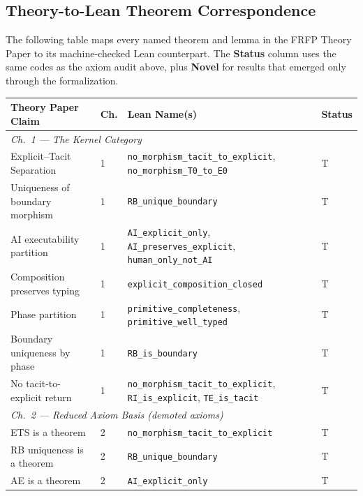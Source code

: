 \subsection*{Theory-to-Lean Theorem Correspondence}
\label{sec:theory_lean_table}

The following table maps every named theorem and lemma in the FRFP Theory Paper
to its machine-checked Lean counterpart.  The \textbf{Status} column uses the
same codes as the axiom audit above, plus \textbf{Novel} for results that
emerged only through the formalization.

\begin{center}
\begin{tabular}{p{4.5cm}lp{4.8cm}l}
\toprule
Theory Paper Claim & Ch. & Lean Name(s) & Status \\
\midrule
\multicolumn{4}{l}{\textit{Ch.~1 — The Kernel Category}} \\[2pt]
Explicit--Tacit Separation
  & 1 & \texttt{no\_morphism\_tacit\_to\_explicit}, \texttt{no\_morphism\_T0\_to\_E0}  & T \\
Uniqueness of boundary morphism
  & 1 & \texttt{RB\_unique\_boundary}              & T \\
AI executability partition
  & 1 & \texttt{AI\_explicit\_only}, \texttt{AI\_preserves\_explicit}, \texttt{human\_only\_not\_AI} & T \\
Composition preserves typing
  & 1 & \texttt{explicit\_composition\_closed}     & T \\
Phase partition
  & 1 & \texttt{primitive\_completeness}, \texttt{primitive\_well\_typed} & T \\
Boundary uniqueness by phase
  & 1 & \texttt{RB\_is\_boundary}                  & T \\
No tacit-to-explicit return
  & 1 & \texttt{no\_morphism\_tacit\_to\_explicit}, \texttt{RI\_is\_explicit}, \texttt{TE\_is\_tacit} & T \\
\midrule
\multicolumn{4}{l}{\textit{Ch.~2 — Reduced Axiom Basis (demoted axioms)}} \\[2pt]
ETS is a theorem
  & 2 & \texttt{no\_morphism\_tacit\_to\_explicit}  & T \\
RB uniqueness is a theorem
  & 2 & \texttt{RB\_unique\_boundary}               & T \\
AE is a theorem
  & 2 & \texttt{AI\_explicit\_only}                 & T \\

\end{tabular}
\end{center}

